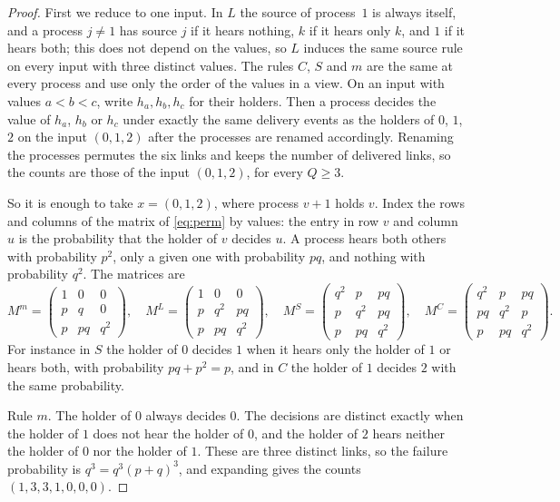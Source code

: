 \documentclass[11pt]{article}
\theoremstyle{remark}
\begin{document}
\begin{proof}
First we reduce to one input. In $L$ the source of process~$1$ is always itself, and a process $j\ne1$ has source $j$ if it hears nothing, $k$ if it hears only $k$, and $1$ if it hears both; this does not depend on the values, so $L$ induces the same source rule on every input with three distinct values. The rules $C$, $S$ and $m$ are the same at every process and use only the order of the values in a view. On an input with values $a<b<c$, write $h_a,h_b,h_c$ for their holders. Then a process decides the value of $h_a$, $h_b$ or $h_c$ under exactly the same delivery events as the holders of $0$, $1$, $2$ on the input $(0,1,2)$ after the processes are renamed accordingly. Renaming the processes permutes the six links and keeps the number of delivered links, so the counts are those of the input $(0,1,2)$, for every $Q\ge3$.

So it is enough to take $x=(0,1,2)$, where process $v+1$ holds $v$. Index the rows and columns of the matrix of \eqref{eq:perm} by values: the entry in row $v$ and column $u$ is the probability that the holder of $v$ decides $u$. A process hears both others with probability $p^2$, only a given one with probability $pq$, and nothing with probability $q^2$. The matrices are
\[
M^{m}=\begin{pmatrix}1&0&0\\ p&q&0\\ p&pq&q^2\end{pmatrix},\quad
M^{L}=\begin{pmatrix}1&0&0\\ p&q^2&pq\\ p&pq&q^2\end{pmatrix},\quad
M^{S}=\begin{pmatrix}q^2&p&pq\\ p&q^2&pq\\ p&pq&q^2\end{pmatrix},\quad
M^{C}=\begin{pmatrix}q^2&p&pq\\ pq&q^2&p\\ p&pq&q^2\end{pmatrix}.
\]
For instance in $S$ the holder of $0$ decides $1$ when it hears only the holder of $1$ or hears both, with probability $pq+p^2=p$, and in $C$ the holder of $1$ decides $2$ with the same probability.

Rule $m$. The holder of $0$ always decides $0$. The decisions are distinct exactly when the holder of $1$ does not hear the holder of $0$, and the holder of $2$ hears neither the holder of $0$ nor the holder of $1$. These are three distinct links, so the failure probability is $q^3=q^3(p+q)^3$, and expanding gives the counts $(1,3,3,1,0,0,0)$.


\end{proof}
\end{document}
